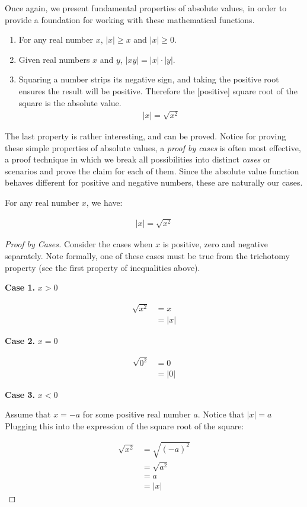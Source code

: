 \documentclass[twoside]{report}
\newcommand{\header}[2]{\begin{flushright} \textbf{#1} #2 \end{flushright}}
\begin{document}
Once again, we present fundamental properties of absolute values, in order to provide a foundation for working with these mathematical functions.

\begin{enumerate}
	\item For any real number $x$, $|x| \ge x$ and $|x| \ge 0$.
	\item Given real numbers $x$ and $y$, $|xy| = |x| \cdot |y|$.
	\item Squaring a number strips its negative sign, and taking the positive root ensures the result will be positive. Therefore the [positive] square root of the square is the absolute value.
	\begin{align*}
		|x| = \sqrt{x^2}
	\end{align*}
\end{enumerate}

The last property is rather interesting, and can be proved. Notice for proving these simple properties of absolute values, a \emph{proof by cases} is often most effective, a proof technique in which we break all possibilities into distinct \emph{cases} or scenarios and prove the claim for each of them. Since the absolute value function behaves different for positive and negative numbers, these are naturally our cases.

\vspace{\baselineskip}
\begin{theorem}
	For any real number $x$, we have:
	
	\begin{align}
		|x| = \sqrt{x^2}
	\end{align}
\end{theorem}

\begin{proof}[Proof by Cases]
	Consider the cases when $x$ is positive, zero and negative separately. Note formally, one of these cases must be true from the trichotomy property (see the first property of inequalities above).
	
	\header{Case 1.}{$x > 0$}
	
	\begin{align*}
		\sqrt{x^2} &= x \\
		&= |x|
	\end{align*}
	
	\header{Case 2.}{$x = 0$}
	
	\begin{align*}
		\sqrt{0^2} &= 0 \\
		&= |0|
	\end{align*}
	
	\header{Case 3.}{$x < 0$}
	Assume that $x = -a$ for some positive real number $a$. Notice that $|x| = a$ Plugging this into the expression of the square root of the square:
	
	\begin{align*}
		\sqrt{x^2} &= \sqrt{(-a)^2} \\
		&= \sqrt{a^2} \\
		&= a \\
		&= |x|
	\end{align*}
\end{proof}
\end{document}
